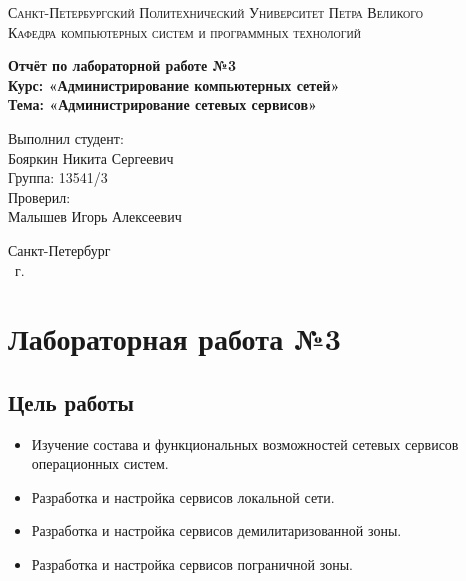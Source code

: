\documentclass[14pt,a4paper,report]{report}
\begin{document}
\def\contentsname{Содержание}

\begin{titlepage}
	\begin{center}
		\textsc{Санкт-Петербургский Политехнический 
			Университет Петра Великого\\[5mm]
			Кафедра компьютерных систем и программных технологий}
		
		\vfill
		
		\textbf{Отчёт по лабораторной работе №3\\[3mm]
			Курс: «Администрирование компьютерных сетей»\\[3mm]
			Тема: «Администрирование сетевых сервисов»\\[35mm]
			}
	\end{center}
	
	\hfill
	\begin{minipage}{.5\textwidth}
		Выполнил студент:\\[2mm] 
		Бояркин Никита Сергеевич\\
		Группа: 13541/3\\[5mm]
		
		Проверил:\\[2mm] 
		Малышев Игорь Алексеевич
	\end{minipage}
	\vfill
	\begin{center}
		Санкт-Петербург\\ \the\year\ г.
	\end{center}
\end{titlepage}

\tableofcontents
\clearpage

\chapter{Лабораторная работа №3}

\section{Цель работы}

\begin{itemize}
	\item Изучение состава и функциональных возможностей сетевых сервисов операционных систем.
	\item Разработка и настройка сервисов локальной сети.
	\item Разработка и настройка сервисов демилитаризованной зоны.
	\item Разработка и настройка сервисов пограничной зоны.
\end{itemize}
\end{document}
